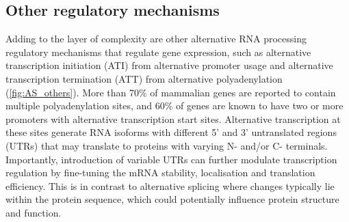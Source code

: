 \newpage
\subsection{Other regulatory mechanisms}
Adding to the layer of complexity are other alternative RNA processing regulatory mechanisms that regulate gene expression, such as alternative transcription initiation (ATI) from alternative promoter usage and alternative transcription termination (ATT) from alternative polyadenylation (\cref{fig:AS_others}). More than 70\% of mammalian genes are reported to contain multiple polyadenylation sites, and 60\% of genes are known to have two or more promoters with alternative transcription start sites\cite{Carninci2006}. Alternative transcription at these sites generate RNA isoforms with different 5' and 3' untranslated regions (UTRs) that may translate to proteins with varying N- and/or C- terminals. Importantly, introduction of variable UTRs can further modulate transcription regulation by fine-tuning the mRNA stability, localisation and translation efficiency\cite{Reyes2018}. This is in contrast to alternative splicing where changes typically lie within the protein sequence, which could potentially influence protein structure and function.

